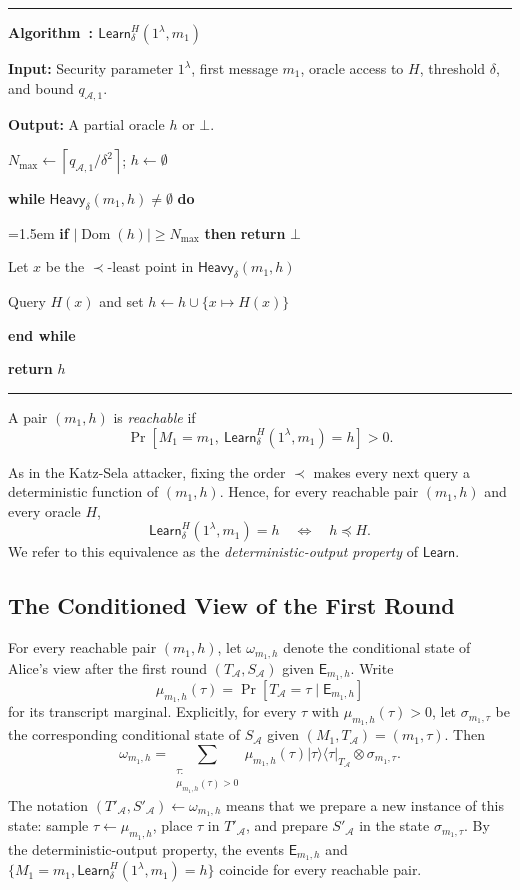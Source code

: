 \documentclass[11pt]{article}
\newcounter{algorithm}
\newcommand{\KwInput}[1]{\noindent\textbf{Input: }#1\par}
\newcommand{\KwOutput}[1]{\noindent\textbf{Output: }#1\par}
\newcommand{\Return}{\textbf{return} }
\newcommand{\While}[2]{%
  \noindent\textbf{while }#1\textbf{ do}\par
  \begingroup\leftskip=1.5em #2\par\endgroup
  \noindent\textbf{end while}\par}
\newcommand{\If}[2]{%
  \noindent\textbf{if }#1\textbf{ then }#2\par}
\newenvironment{algorithm}[1][]{%
  \par\medskip\noindent\begin{minipage}{\linewidth}\small
  \hrule\smallskip
  \renewcommand{\caption}[1]{%
    \refstepcounter{algorithm}%
    \noindent\textbf{Algorithm~\thealgorithm: ##1}\par\smallskip}
  \renewcommand{\;}{\par}%
}{%
  \smallskip\hrule\end{minipage}\par\medskip}
\newcommand{\cA}{\mathcal{A}}
\newcommand{\Dom}{\operatorname{Dom}}
\newcommand{\Learn}{\mathsf{Learn}}
\newcommand{\Heavy}{\mathsf{Heavy}}
\newcommand{\ket}[1]{\lvert #1\rangle}
\newcommand{\bra}[1]{\langle #1\rvert}
\newcommand{\proj}[1]{\ket{#1}\!\bra{#1}}
\newcommand{\ceil}[1]{\left\lceil #1\right\rceil}
\begin{document}
\begin{algorithm}[H]
\caption{\(\Learn_\delta^H(1^\lambda,m_1)\)}
\label{alg:learn}
\KwInput{Security parameter \(1^\lambda\), first message \(m_1\), oracle
access to \(H\), threshold \(\delta\), and bound \(q_{\cA,1}\).}
\KwOutput{A partial oracle \(h\) or \(\bot\).}
\(N_{\max}\gets\ceil{q_{\cA,1}/\delta^2}\); \(h\gets\emptyset\)\;
\While{\(\Heavy_\delta(m_1,h)\neq\emptyset\)}{
  \If{\(|\Dom(h)|\ge N_{\max}\)}{\Return \(\bot\)\;}
  Let \(x\) be the \(\prec\)-least point in \(\Heavy_\delta(m_1,h)\)\;
  Query \(H(x)\) and set \(h\gets h\cup\{x\mapsto H(x)\}\)\;
}
\Return \(h\)\;
\end{algorithm}

A pair \((m_1,h)\) is \emph{reachable} if
\[
  \Pr[M_1=m_1,\ \Learn_\delta^H(1^\lambda,m_1)=h]>0.
\]

As in the Katz-Sela attacker, fixing the order \(\prec\) makes every next
query a deterministic function of \((m_1,h)\). Hence, for every reachable
pair \((m_1,h)\) and every oracle \(H\),
\[
  \Learn_\delta^H(1^\lambda,m_1)=h
  \quad\Longleftrightarrow\quad
  h\preceq H.
\]
We refer to this equivalence as the \emph{deterministic-output property} of
\(\Learn\).

\subsection{The Conditioned View of the First Round}

For every reachable pair \((m_1,h)\), let \(\omega_{m_1,h}\)
denote the conditional state of Alice's view after the first round
\((T_{\cA},S_{\cA})\) given \(\mathsf E_{m_1,h}\).  Write
\[
  \mu_{m_1,h}(\tau)
  =
  \Pr[T_{\cA}=\tau\mid\mathsf E_{m_1,h}]
\]
for its transcript marginal.  Explicitly,
for every \(\tau\) with \(\mu_{m_1,h}(\tau)>0\), let
\(\sigma_{m_1,\tau}\) be the corresponding conditional state of
\(S_{\cA}\) given \((M_1,T_{\cA})=(m_1,\tau)\). Then
\[
  \omega_{m_1,h}
  =
  \sum_{\substack{\tau:\\
        \mu_{m_1,h}(\tau)>0}}
  \mu_{m_1,h}(\tau)
  \proj{\tau}_{T_{\cA}}\otimes\sigma_{m_1,\tau}.
\]
The notation
\((T'_{\cA},S'_{\cA})\leftarrow\omega_{m_1,h}\) means that we prepare a new
instance of this state: sample \(\tau\leftarrow\mu_{m_1,h}\), place \(\tau\)
in \(T'_{\cA}\), and prepare \(S'_{\cA}\) in the state
\(\sigma_{m_1,\tau}\). By the deterministic-output property, the events
\(\mathsf E_{m_1,h}\) and
\(\{M_1=m_1,\Learn_\delta^H(1^\lambda,m_1)=h\}\) coincide for every
reachable pair.
\end{document}

